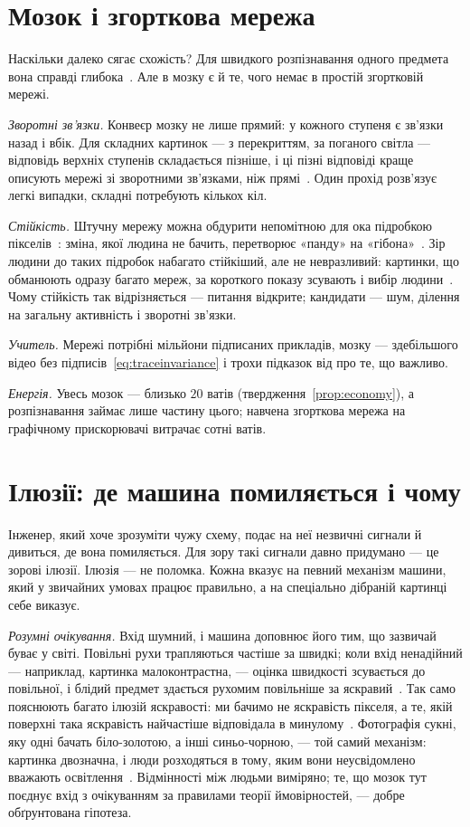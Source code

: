 \section{Мозок і згорткова мережа}

Наскільки далеко сягає схожість? Для швидкого розпізнавання одного предмета вона справді глибока~\cite{Yamins2014}. Але в мозку є й те, чого немає в простій згортковій мережі.

\emph{Зворотні зв'язки.} Конвеєр мозку не лише прямий: у кожного ступеня є зв'язки назад і вбік. Для складних картинок --- з перекриттям, за поганого світла --- відповідь верхніх ступенів складається пізніше, і ці пізні відповіді краще описують мережі зі зворотними зв'язками, ніж прямі~\cite{Kar2019}. Один прохід розв'язує легкі випадки, складні потребують кількох кіл.

\emph{Стійкість.} Штучну мережу можна обдурити непомітною для ока підробкою пікселів~\cite{Szegedy2014}: зміна, якої людина не бачить, перетворює «панду» на «гібона»~\cite{Goodfellow2015}. Зір людини до таких підробок набагато стійкіший, але не невразливий: картинки, що обманюють одразу багато мереж, за короткого показу зсувають і вибір людини~\cite{Elsayed2018}. Чому стійкість так відрізняється --- питання відкрите; кандидати --- шум, ділення на загальну активність і зворотні зв'язки.

\emph{Учитель.} Мережі потрібні мільйони підписаних прикладів, мозку --- здебільшого відео без підписів~\eqref{eq:traceinvariance} і трохи підказок від  про те, що важливо.

\emph{Енергія.} Увесь мозок --- близько $20$ ватів (твердження~\ref{prop:economy}), а розпізнавання займає лише частину цього; навчена згорткова мережа на графічному прискорювачі витрачає сотні ватів.

\section{Ілюзії: де машина помиляється і чому}
\label{sec:illusions}

Інженер, який хоче зрозуміти чужу схему, подає на неї незвичні сигнали й дивиться, де вона помиляється. Для зору такі сигнали давно придумано --- це зорові ілюзії. Ілюзія --- не поломка. Кожна вказує на певний механізм машини, який у звичайних умовах працює правильно, а на спеціально дібраній картинці себе виказує.

\emph{Розумні очікування.} Вхід шумний, і машина доповнює його тим, що зазвичай буває у світі. Повільні рухи трапляються частіше за швидкі; коли вхід ненадійний --- наприклад, картинка малоконтрастна, --- оцінка швидкості зсувається до повільної, і блідий предмет здається рухомим повільніше за яскравий~\cite{Weiss2002}. Так само пояснюють багато ілюзій яскравості: ми бачимо не яскравість пікселя, а те, якій поверхні така яскравість найчастіше відповідала в минулому~\cite{Purves2011}. Фотографія сукні, яку одні бачать біло-золотою, а інші синьо-чорною, --- той самий механізм: картинка двозначна, і люди розходяться в тому, яким вони неусвідомлено вважають освітлення~\cite{LaferSousa2015,Wallisch2017}. Відмінності між людьми виміряно; те, що мозок тут поєднує вхід з очікуванням за правилами теорії ймовірностей, --- добре обґрунтована гіпотеза.

